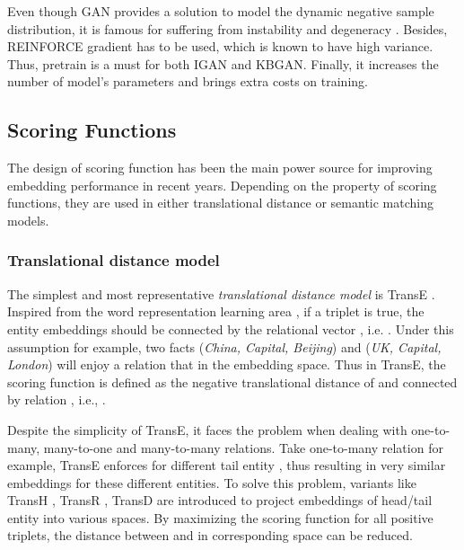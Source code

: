 \documentclass[conference]{IEEEtran}
\begin{document}
{
Even though GAN provides a solution to model the dynamic negative sample distribution,
it is famous for suffering from instability and degeneracy \cite{arjovsky2017wasserstein,gulrajani2017improved}.
Besides, REINFORCE gradient \cite{williams1992simple} has to be used, which is known to have high variance.
Thus, 
pretrain is a must for both IGAN and KBGAN.
Finally, it increases the number of model's parameters and brings extra costs on training.
}

\subsection{Scoring Functions}
\label{sec:scorefunc}

The design of scoring function has been the main power source
for improving embedding performance in recent years.
Depending on the property of scoring functions,
they are used in either translational distance 
or semantic matching models.


\subsubsection{Translational distance model}

The simplest and most representative \emph{translational distance model} is TransE \cite{bordes2013translating}. 
Inspired from the word representation learning area \cite{mikolov2013linguistic}, 
if a triplet  is true, the entity embeddings  should be connected by the relational vector , 
i.e. . 
Under this assumption for example, two facts (\emph{China, Capital, Beijing}) and (\emph{UK, Capital, London}) will enjoy a relation that  in the embedding space. 
Thus in TransE, 
the scoring function is defined as the negative translational distance of  and  connected by relation ,
i.e., .


Despite the simplicity of TransE, it faces the problem when dealing with one-to-many, many-to-one and many-to-many relations. 
Take one-to-many relation for example, TransE enforces  for different tail entity , 
thus resulting in very similar embeddings for these different entities. 
To solve this problem, variants like 
TransH \cite{wang2014knowledge}, TransR \cite{lin2015learning}, 
TransD \cite{ji2015knowledge} are introduced to project embeddings of head/tail entity  into various spaces. 
By maximizing the scoring function for all positive triplets, the distance between  and  in corresponding space can be reduced. 
\end{document}
